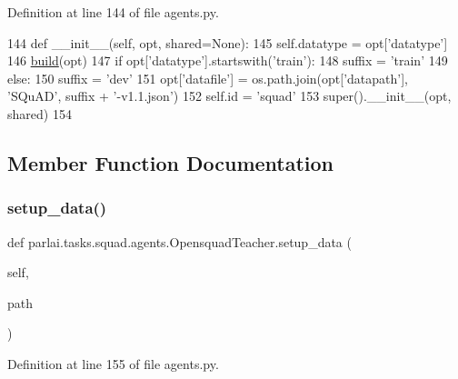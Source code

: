 Definition at line 144 of file agents.\+py.


\begin{DoxyCode}
144     \textcolor{keyword}{def }\_\_init\_\_(self, opt, shared=None):
145         self.datatype = opt[\textcolor{stringliteral}{'datatype'}]
146         \hyperlink{namespaceparlai_1_1mturk_1_1tasks_1_1talkthewalk_1_1download_a8c0fbb9b6dfe127cb8c1bd6e7c4e33fd}{build}(opt)
147         \textcolor{keywordflow}{if} opt[\textcolor{stringliteral}{'datatype'}].startswith(\textcolor{stringliteral}{'train'}):
148             suffix = \textcolor{stringliteral}{'train'}
149         \textcolor{keywordflow}{else}:
150             suffix = \textcolor{stringliteral}{'dev'}
151         opt[\textcolor{stringliteral}{'datafile'}] = os.path.join(opt[\textcolor{stringliteral}{'datapath'}], \textcolor{stringliteral}{'SQuAD'}, suffix + \textcolor{stringliteral}{'-v1.1.json'})
152         self.id = \textcolor{stringliteral}{'squad'}
153         super().\_\_init\_\_(opt, shared)
154 
\end{DoxyCode}


\subsection{Member Function Documentation}
\mbox{\label{classparlai_1_1tasks_1_1squad_1_1agents_1_1OpensquadTeacher_a3cec5f85dee7d30e1a80a4ce8c775a07}} 
\subsubsection{\texorpdfstring{setup\+\_\+data()}{setup\_data()}}
{\footnotesize\ttfamily def parlai.\+tasks.\+squad.\+agents.\+Opensquad\+Teacher.\+setup\+\_\+data (\begin{DoxyParamCaption}\item[{}]{self,  }\item[{}]{path }\end{DoxyParamCaption})}



Definition at line 155 of file agents.\+py.


